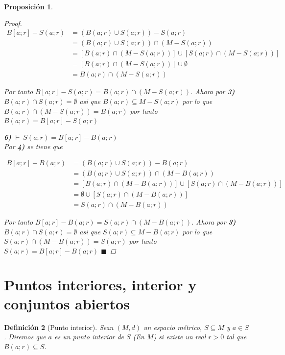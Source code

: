 \documentclass[oneside]{book} %
\theoremstyle{Teorema}
\newtheorem{Definicion}{Definición}[chapter]
\newtheorem{Proposicion}[Definicion]{Proposición}
\theoremstyle{Ejemplos}
\theoremstyle{[Obs]}
\renewcommand{\{}{\left\lbrace} %
\renewcommand{\}}{\right\rbrace} %
\renewcommand{\u}{\cup} %
\newcommand{\n}{\cap} %
\renewcommand{\sc}{\subseteq} %
\renewcommand{\qed}{$\blacksquare$} %
\newcommand{\pd}{$\vdash\ $} %
\begin{document}
\begin{Proposicion}
\begin{proof}
					\begin{align*}
						B[a;r] - S(a;r) &= (B(a;r) \u S(a;r)) - S(a;r)  \\
						&= (B(a;r) \u S(a;r)) \n (M - S(a;r)) \\ 
						&= [B(a;r) \n (M - S(a;r))] \u [S(a;r) \n (M - S(a;r))] \\ 
						&= [B(a;r) \n (M - S(a;r))] \u \emptyset \\ 
						&= B(a;r) \n (M - S(a;r))
					\end{align*}
					
					Por tanto $B[a;r] - S(a;r) = B(a;r) \n (M - S(a;r))$. Ahora por \textbf{3)} $B(a;r) \n S(a; r) = \emptyset$ asi que $B(a;r) \sc M - S(a;r)$ por lo que $B(a;r) \n (M - S(a;r)) = B(a;r)$ por tanto $B(a;r) = B[a;r] - S(a;r)$ 
					
					\textbf{6)} \pd $S(a;r) = B[a;r] - B(a;r)$ \\
					Por \textbf{4)} se tiene que 
					
					\begin{align*}
						B[a;r] - B(a;r) &= (B(a;r) \u S(a;r)) - B(a;r)  \\
						&= (B(a;r) \u S(a;r)) \n (M - B(a;r)) \\ 
						&= [B(a;r) \n (M - B(a;r))] \u [S(a;r) \n (M - B(a;r))] \\ 
						&= \emptyset \u [S(a;r) \n (M - B(a;r))] \\ 
						&= S(a;r) \n (M - B(a;r))
					\end{align*}
					
					Por tanto $B[a;r] - B(a;r) = S(a;r) \n (M - B(a;r))$. Ahora por \textbf{3)} $B(a;r) \n S(a; r) = \emptyset$ asi que $S(a;r) \sc M - B(a;r)$ por lo que $S(a;r) \n (M - B(a;r)) = S(a;r)$ por tanto $S(a;r) = B[a;r] - B(a;r)$ \qed

				\end{proof}

			\end{Proposicion}

		\section{Puntos interiores, interior y conjuntos abiertos}

			\begin{Definicion}[Punto interior]\setlength{\parindent}{0em}

				Sean $(M, d)$ un espacio métrico, $S \sc M$ y $a \in S$. Diremos que $a$ es un punto interior de $S$ (En $M$) si existe un real $r > 0$ tal que $B(a;r) \sc S$. \\

			\end{Definicion}
\end{document}
